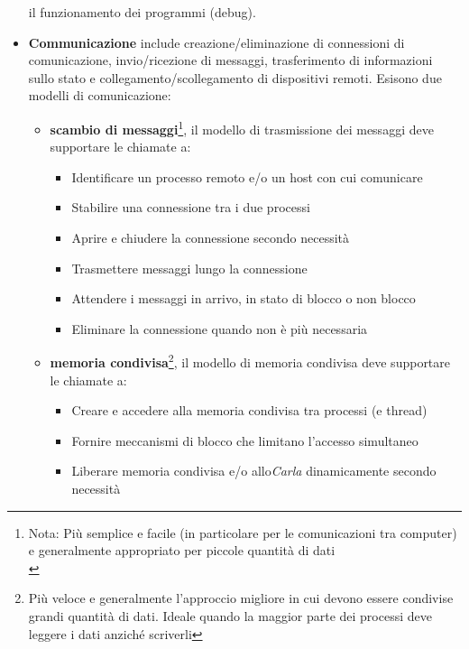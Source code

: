 \documentclass{article}
\begin{document}
\begin{itemize}
    il funzionamento dei programmi (debug). 
    \item \textbf{Communicazione} include creazione/eliminazione di connessioni di comunicazione, invio/ricezione di messaggi, trasferimento di informazioni sullo stato e collegamento/scollegamento di dispositivi remoti. Esisono due modelli di comunicazione: 
    \begin{itemize}
        \item \textbf{scambio di messaggi}\footnote{Nota: Più semplice e facile (in particolare per le comunicazioni tra computer) e generalmente appropriato per piccole quantità di dati\\}, il modello di trasmissione dei messaggi deve supportare le chiamate a:
        \begin{itemize}
            \item Identificare un processo remoto e/o un host con cui comunicare
            \item Stabilire una connessione tra i due processi
            \item Aprire e chiudere la connessione secondo necessità
            \item Trasmettere messaggi lungo la connessione
            \item Attendere i messaggi in arrivo, in stato di blocco o non blocco
            \item Eliminare la connessione quando non è più necessaria
        \end{itemize}
        \item \textbf{memoria condivisa}\footnote{Più veloce e generalmente l'approccio migliore in cui devono essere condivise grandi quantità di dati. Ideale quando la maggior parte dei processi deve leggere i dati anziché scriverli}, il modello di memoria condivisa deve supportare le chiamate a:
        \begin{itemize}
            \item  Creare e accedere alla memoria condivisa tra processi (e thread) 
            \item Fornire meccanismi di blocco che limitano l'accesso simultaneo
            \item Liberare memoria condivisa e/o allo\textit{Carla} dinamicamente secondo necessità
        \end{itemize}
    \end{itemize}
\end{itemize}
\end{document}
